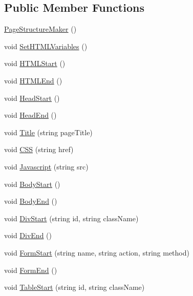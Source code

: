\subsection*{Public Member Functions}
\begin{DoxyCompactItemize}
\item 
\hyperlink{classPageStructureMaker_a95e6305a2b5121840fb5b74297a040ce}{Page\-Structure\-Maker} ()
\item 
void \hyperlink{classPageStructureMaker_aaf78d67380c400cc0057c6519276f721}{Set\-H\-T\-M\-L\-Variables} ()
\item 
void \hyperlink{classPageStructureMaker_ad25d6abc983253567e2370882fc1b407}{H\-T\-M\-L\-Start} ()
\item 
void \hyperlink{classPageStructureMaker_a63b877af1c2c8de8332e3f7eb4c2c2b0}{H\-T\-M\-L\-End} ()
\item 
void \hyperlink{classPageStructureMaker_a14312134cb108f91f2e6d9cbd6916e97}{Head\-Start} ()
\item 
void \hyperlink{classPageStructureMaker_ad64115d592b0989b422a93f85278186e}{Head\-End} ()
\item 
void \hyperlink{classPageStructureMaker_a81e902ddc0c0287df1ba0f614a3774d6}{Title} (string page\-Title)
\item 
void \hyperlink{classPageStructureMaker_aacdb11817f8ab246bc59c552e04e862d}{C\-S\-S} (string href)
\item 
void \hyperlink{classPageStructureMaker_ac221d1169f4dbcef6adb00938919193d}{Javascript} (string src)
\item 
void \hyperlink{classPageStructureMaker_ab7a645675166f34fac99f1ed8feb7c27}{Body\-Start} ()
\item 
void \hyperlink{classPageStructureMaker_ac91e234e2d54dedd9d7e556fabf21d2b}{Body\-End} ()
\item 
void \hyperlink{classPageStructureMaker_a927f92889555dd316c129f706be86a5c}{Div\-Start} (string id, string class\-Name)
\item 
void \hyperlink{classPageStructureMaker_a2913e76bf188ed777dcd33003ef6207d}{Div\-End} ()
\item 
void \hyperlink{classPageStructureMaker_a3f25d5b844a2251883acb80d8fabb77d}{Form\-Start} (string name, string action, string method)
\item 
void \hyperlink{classPageStructureMaker_a65d97f23bb543f3db5201b2009f7f65a}{Form\-End} ()
\item 
void \hyperlink{classPageStructureMaker_a04e68e69005f3933e0f496c3db474daf}{Table\-Start} (string id, string class\-Name)

\end{DoxyCompactItemize}
